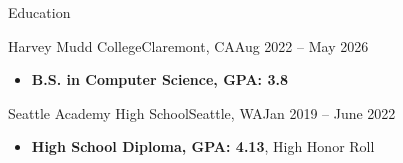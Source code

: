 \documentclass[]{mcdowellcv}
\begin{document}
\makeheader


\begin{cvsection}{Education}
	\begin{cvsubsection}{Harvey Mudd College}{Claremont, CA}{Aug 2022 -- May 2026}
		\begin{itemize}
			\item \textbf{B.S. in Computer Science, GPA: 3.8}
		\end{itemize}
	\end{cvsubsection}
	\begin{cvsubsection}{Seattle Academy High School}{Seattle, WA}{Jan 2019 -- June 2022}
		\begin{itemize}
			\item \textbf{High School Diploma, GPA: 4.13}, High Honor Roll
		\end{itemize}
	\end{cvsubsection}
\end{cvsection}
\end{document}
